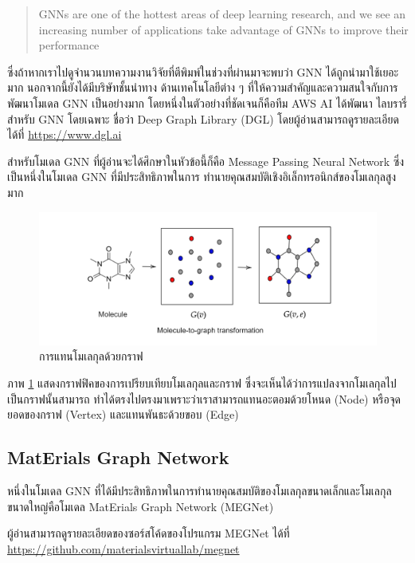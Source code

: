 \blockquote{GNNs are one of the hottest areas of deep learning research, and we see an increasing number of 
applications take advantage of GNNs to improve their performance}

\noindent ซึ่งถ้าหากเราไปดูจำนวนบทความงานวิจัยที่ตีพิมพ์ในช่วงที่ผ่านมาจะพบว่า GNN ได้ถูกนำมาใช้เยอะมาก นอกจากนี้ยังได้มีบริษัทชั้นนำทาง%
ด้านเทคโนโลยีต่าง ๆ ที่ให้ความสำคัญและความสนใจกับการพัฒนาโมเดล GNN เป็นอย่างมาก โดยหนึ่งในตัวอย่างที่ชัดเจนก็คือทีม AWS AI ได้พัฒนา%
ไลบรารี่สำหรับ GNN โดยเฉพาะ ชื่อว่า Deep Graph Library (DGL) โดยผู้อ่านสามารถดูรายละเอียดได้ที่ \url{https://www.dgl.ai}

สำหรับโมเดล GNN ที่ผู้อ่านจะได้ศึกษาในหัวข้อนี้ก็คือ Message Passing Neural Network ซึ่งเป็นหนึ่งในโมเดล GNN ที่มีประสิทธิภาพในการ%
ทำนายคุณสมบัติเชิงอิเล็กทรอนิกส์ของโมเลกุลสูงมาก

\begin{figure}[htbp]
    \centering
    \includegraphics[width=\linewidth]{fig/mol-2-graph.png}
    \caption{การแทนโมเลกุลด้วยกราฟ}
    \label{fig:mol_2_graph}
\end{figure}

ภาพ \ref{fig:mol_2_graph} แสดงกราฟฟิคของการเปรียบเทียบโมเลกุลและกราฟ ซึ่งจะเห็นได้ว่าการแปลงจากโมเลกุลไปเป็นกราฟนั้นสามารถ%
ทำได้ตรงไปตรงมาเพราะว่าเราสามารถแทนอะตอมด้วยโหนด (Node) หรือจุดยอดของกราฟ (Vertex) และแทนพันธะด้วยขอบ (Edge)

\subsection{MatErials Graph Network}
\label{ssec:megnet}

หนึ่งในโมเดล GNN ที่ได้มีประสิทธิภาพในการทำนายคุณสมบัติของโมเลกุลขนาดเล็กและโมเลกุลขนาดใหญ่คือโมเดล MatErials Graph Network 
(MEGNet)\autocite{chen2019}

ผู้อ่านสามารถดูรายละเอียดของซอร์สโค้ดของโปรแกรม MEGNet ได้ที่ \url{https://github.com/materialsvirtuallab/megnet}

